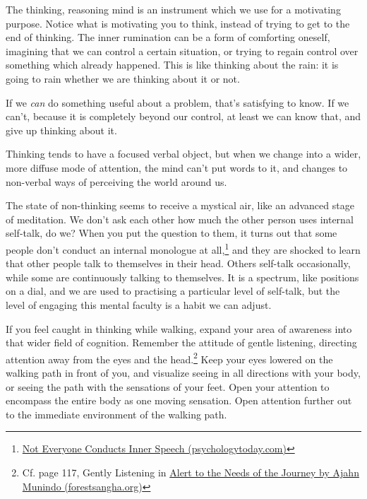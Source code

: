 The thinking, reasoning mind is an instrument which we use for a
motivating purpose. Notice what is motivating you to think, instead of
trying to get to the end of thinking. The inner rumination can be a form
of comforting oneself, imagining that we can control a certain
situation, or trying to regain control over something which already
happened. This is like thinking about the rain: it is going to rain
whether we are thinking about it or not.

If we \emph{can} do something useful about a problem, that's satisfying
to know. If we can't, because it is completely beyond our control, at
least we can know that, and give up thinking about it.

Thinking tends to have a focused verbal object, but when we change into
a wider, more diffuse mode of attention, the mind can't put words to it,
and changes to non-verbal ways of perceiving the world around us.

The state of non-thinking seems to receive a mystical air, like an
advanced stage of meditation. We don't ask each other how much the other
person uses internal self-talk, do we? When you put the question to
them, it turns out that some people don't conduct an internal monologue
at all,\footnote{\href{https://www.psychologytoday.com/us/blog/pristine-inner-experience/201110/not-everyone-conducts-inner-speech}{Not
  Everyone Conducts Inner Speech (psychologytoday.com)}} and they are
shocked to learn that other people talk to themselves in their head.
Others self-talk occasionally, while some are continuously talking to
themselves. It is a spectrum, like positions on a dial, and we are used
to practising a particular level of self-talk, but the level of engaging
this mental faculty is a habit we can adjust.

If you feel caught in thinking while walking, expand your area of
awareness into that wider field of cognition. Remember the attitude of
gentle listening, directing attention away from the eyes and the
head.\footnote{Cf. page 117, Gently Listening in
  \href{https://forestsangha.org/teachings/books/alert-to-the-needs-of-the-journey?language=English}{Alert
  to the Needs of the Journey by Ajahn Munindo (forestsangha.org)}} Keep
your eyes lowered on the walking path in front of you, and visualize
seeing in all directions with your body, or seeing the path with the
sensations of your feet. Open your attention to encompass the entire
body as one moving sensation. Open attention further out to the
immediate environment of the walking path.

